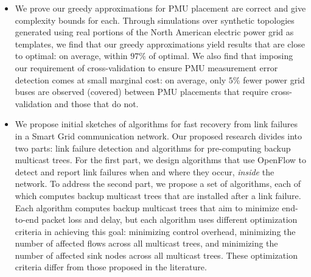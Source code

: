 \begin{itemize}
	\item We prove our greedy approximations for PMU placement are correct and give complexity bounds for each.  Through simulations over synthetic topologies generated using real portions of the 
		North American electric power grid as templates, we find that our greedy approximations yield results that are close to optimal: on average, within $97\%$ of optimal.  We also find that 
		imposing our requirement of cross-validation to ensure PMU measurement error detection comes at small marginal cost: on average, only $5\%$ fewer power grid buses are observed (covered) 
		between PMU placements that require cross-validation and those that do not. 
	

	\item We propose initial sketches of algorithms for fast recovery from link failures in a Smart Grid communication network. Our proposed research divides into two parts: link failure detection and algorithms for pre-computing
		backup multicast trees.  For the first part, we design algorithms that use OpenFlow to detect and report link failures when and where they occur, \emph{inside} the network.  To address the second part, we 
		propose a set of algorithms, each of which computes backup multicast trees that are installed after a link failure.  Each algorithm computes backup multicast trees that aim to minimize end-to-end packet loss and delay,
		but each algorithm uses different optimization criteria in achieving this goal: minimizing control overhead, minimizing the number of affected flows across all multicast trees, and minimizing the number of affected sink nodes across all multicast trees. 
		These optimization criteria differ from those proposed in the literature.

		
		




\end{itemize}
